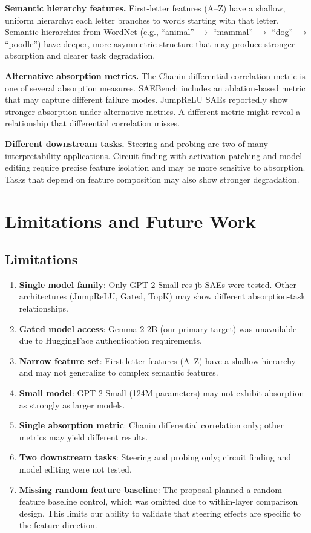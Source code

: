 \documentclass{article}
\begin{document}
\textbf{Semantic hierarchy features.} First-letter features (A--Z) have a shallow, uniform hierarchy: each letter branches to words starting with that letter. Semantic hierarchies from WordNet (e.g., ``animal'' $\rightarrow$ ``mammal'' $\rightarrow$ ``dog'' $\rightarrow$ ``poodle'') have deeper, more asymmetric structure that may produce stronger absorption and clearer task degradation.

\textbf{Alternative absorption metrics.} The Chanin differential correlation metric is one of several absorption measures. SAEBench includes an ablation-based metric that may capture different failure modes. JumpReLU SAEs reportedly show stronger absorption under alternative metrics. A different metric might reveal a relationship that differential correlation misses.

\textbf{Different downstream tasks.} Steering and probing are two of many interpretability applications. Circuit finding with activation patching and model editing require precise feature isolation and may be more sensitive to absorption. Tasks that depend on feature composition may also show stronger degradation.

\section{Limitations and Future Work}

\subsection{Limitations}

\begin{enumerate}
    \item \textbf{Single model family}: Only GPT-2 Small res-jb SAEs were tested. Other architectures (JumpReLU, Gated, TopK) may show different absorption-task relationships.
    \item \textbf{Gated model access}: Gemma-2-2B (our primary target) was unavailable due to HuggingFace authentication requirements.
    \item \textbf{Narrow feature set}: First-letter features (A--Z) have a shallow hierarchy and may not generalize to complex semantic features.
    \item \textbf{Small model}: GPT-2 Small (124M parameters) may not exhibit absorption as strongly as larger models.
    \item \textbf{Single absorption metric}: Chanin differential correlation only; other metrics may yield different results.
    \item \textbf{Two downstream tasks}: Steering and probing only; circuit finding and model editing were not tested.
    \item \textbf{Missing random feature baseline}: The proposal planned a random feature baseline control, which was omitted due to within-layer comparison design. This limits our ability to validate that steering effects are specific to the feature direction.
\end{enumerate}
\end{document}
